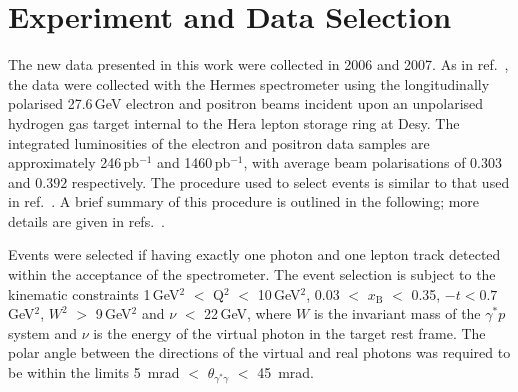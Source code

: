 \section{Experiment and Data Selection}
The new data presented in this work were collected in 2006 and 2007. As in ref.~\cite{Air09}, the data were collected with the H{\sc ermes}
spectrometer \cite{Ack98} using the longitudinally polarised 27.6\,GeV
electron and positron beams incident upon an unpolarised hydrogen gas
target internal to the H{\sc era} lepton storage ring at D{\sc esy}. The integrated luminosities of the electron and positron data samples are
approximately 246\,pb$^{-1}$ and 1460\,pb$^{-1}$, with average beam polarisations of $0.303$ and $0.392$ respectively. The procedure used to select events is similar to that used in ref.~\cite{Air09}. A brief summary of this procedure is outlined in the following; more details are given in refs.~\cite{Zei09,Bur10}.

Events were selected if having exactly one photon and one lepton
track detected within the acceptance of the spectrometer.
The event selection is subject to the kinematic constraints 1\,GeV$^{2}$ $<$
Q$^{2}$ $<$ 10\,GeV$^{2}$, 0.03 $<$ $x_{\textrm{B}}$ $<$ 0.35,
$-t < 0.7$\,GeV$^2$, $W^{2}$ $>$
9\,GeV$^{2}$ and $\nu$ $<$ 22\,GeV, where $W$ is the invariant mass of the
$\gamma^{*}p$ system and $\nu$ is the energy of the virtual photon in the target
rest frame. The polar angle between the directions of the virtual and real photons was required to
be within the limits 5~mrad $<$
$\theta_{\gamma^{*}\gamma}$ $<$ 45~mrad. 

